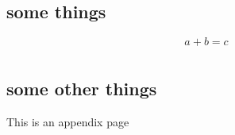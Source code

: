 \documentclass[
      12pt,
            twoside]{report}
\newlength{\cslhangindent}
\newlength{\cslentryspacingunit} %
\newenvironment{CSLReferences}[2] %
   {%
    \setlength{\parindent}{0pt}
    \ifodd #1
    \let\oldpar\par
    \def\par{\hangindent=\cslhangindent\oldpar}
    \fi
    \setlength{\parskip}{#2\cslentryspacingunit}
   }%
   {}
\begin{document}
\hypertarget{refs}{}
\begin{CSLReferences}{0}{0}
\end{CSLReferences}

\appendix

\hypertarget{section}{%
\chapter{}\label{section}}

\hypertarget{some-things}{%
\section{some things}\label{some-things}}

\[ a+b=c \]

\hypertarget{section-1}{%
\chapter{}\label{section-1}}

\hypertarget{some-other-things}{%
\section{some other things}\label{some-other-things}}

This is an appendix page

            \renewcommand\bibname{REFERENCES}
      \cleardoublepage
  
  
\end{document}
